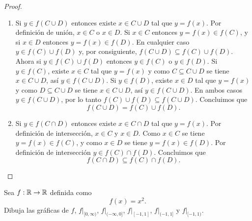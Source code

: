 \documentclass[12pt,a4paper]{article}
\begin{document}
    \begin{proof}
        \begin{enumerate}
            \item[(a)] Si $y\in f(C\cup D)$ entonces existe $x\in C\cup D$ tal que $y=f(x)$. Por definición de unión, $x\in C$ o $x\in D$. Si $x\in C$ entonces $y=f(x)\in f(C)$, y si $x\in D$ entonces $y=f(x)\in f(D)$. En cualquier caso
            $y\in f(C)\cup f(D)$ y, por consiguiente, $f(C\cup D)\subseteq f(C)\cup f(D)$.
            Ahora si $y\in f(C)\cup f(D)$ entonces $y\in f(C)$ o $y\in f(D)$. Si $y\in f(C)$, existe $x\in C$ tal que $y=f(x)$ y como $C\subseteq C\cup D$ se tiene $x\in C\cup D$, así $y\in f(C\cup D)$.
            Si $y\in f(D)$, existe $x\in D$ tal que $y=f(x)$ y como $D\subseteq C\cup D$ se tiene $x\in C\cup D$, así $y\in f(C\cup D)$. En ambos casos $y\in f(C\cup D)$, por lo tanto $f(C)\cup f(D)\subseteq f(C\cup D)$.
            Concluimos que
            \begin{equation*}
                f(C\cup D)=f(C)\cup f(D).
            \end{equation*}
            \item[(b)] Si $y\in f(C\cap D)$ entonces existe $x\in C\cap D$ tal que $y=f(x)$. Por definición de intersección, $x\in C$ y $x\in D$. Como $x\in C$ se tiene $y=f(x)\in f(C)$, y como $x\in D$ se tiene $y=f(x)\in f(D)$. Por definición de intersección $y\in f(C)\cap f(D)$. Concluimos que
            \begin{equation*}
                f(C\cap D)\subseteq f(C)\cap f(D).
            \end{equation*}
        \end{enumerate}
    \end{proof}

    \newpage

    \begin{problema}
        Sea $f:\mathbb{R}\to\mathbb{R}$ definida como
        \begin{equation*}
            f(x)=x^{2}.
        \end{equation*}
        Dibuja las gráficas de $f$, $f|_{[0,\infty)}$, $f|_{(-\infty,0]}$, $f|_{[-1,1]}$, $f|_{(-1,1]}$ y $f|_{[-1,1)}$.
    \end{problema}
\end{document}
